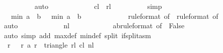 \begin{isabellebody}
\ \ \ \ \ \ \ \ \isamarkupfalse%
\ auto\isanewline
\ \ \ \ \isamarkupfalse%
\isanewline
\ \ \ \ \ \ \isamarkupfalse%
\ {\isachardoublequoteopen}{\isacharquery}c{}l\ {\isasymle}\ {\isacharquery}r{}l{\isachardoublequoteclose}\isanewline
\ \ \ \ \ \ \ \ \isamarkupfalse%
\ simp\isanewline
\ \ \ \ \isamarkupfalse%
\isanewline
\ \ \ \ \ \ \isamarkupfalse%
\ {\isachardoublequoteopen}{}{}{}{}\ {\isacharminus}\ min\ {\isacharparenleft}a\ {}{}{}{}{\isacharparenright}\ {\isacharparenleft}b\ {}{}{}{}{\isacharparenright}\ {\isacharplus}\ min\ {\isacharparenleft}a\ {}{}{}{}{\isacharparenright}\ {\isacharparenleft}b\ {}{}{}{}{\isacharparenright}\ {\isasymle}\ {}{}{}{}{\isachardoublequoteclose}\isanewline
\ \ \ \ \ \ \ \ \isamarkupfalse%
\ {\isacharasterisk}{\isacharparenleft}{}{\isacharparenright}{\isacharbrackleft}rule{\isacharunderscore}format{\isacharcomma}\ of\ {}{}{}{}{\isacharbrackright}\ {\isacharasterisk}{\isacharparenleft}{}{\isacharparenright}{\isacharbrackleft}rule{\isacharunderscore}format{\isacharcomma}\ of\ {}{}{}{}{\isacharbrackright}\isanewline
\ \ \ \ \ \ \ \ \isamarkupfalse%
\ auto\isanewline
\ \ \ \ \isamarkupfalse%
\isanewline
\ \ \ \ \ \ \isamarkupfalse%
\ {\isachardoublequoteopen}{\isacharquery}nl\ {\isasymge}\ {}{}{}{}{\isachardoublequoteclose}\isanewline
\ \ \ \ \ \ \ \ \isamarkupfalse%
\ ab{\isacharbrackleft}rule{\isacharunderscore}format{\isacharcomma}\ of\ {}{}{}{}{\isacharbrackright}\ False\isanewline
\ \ \ \ \ \ \ \ \isamarkupfalse%
\ {\isacharparenleft}auto\ simp\ add{\isacharcolon}\ max{\isacharunderscore}def\ min{\isacharunderscore}def\ split{\isacharcolon}\ if{\isacharunderscore}split{\isacharunderscore}asm{\isacharparenright}\isanewline
\ \ \ \ \isamarkupfalse%
\isanewline
\ \ \ \ \ \ \isamarkupfalse%
\ {\isachardoublequoteopen}{\isasymforall}\ r\ {\isacharless}\ {}{}{}{}{\isachardot}\ {\isacharparenleft}r{\isacharcomma}\ a\ r{\isacharparenright}\ {\isasymnotin}\ triangle\ {\isacharquery}r{}l\ {\isacharquery}c{}l\ {\isacharquery}nl{\isachardoublequoteclose}\isanewline

\end{isabellebody}
